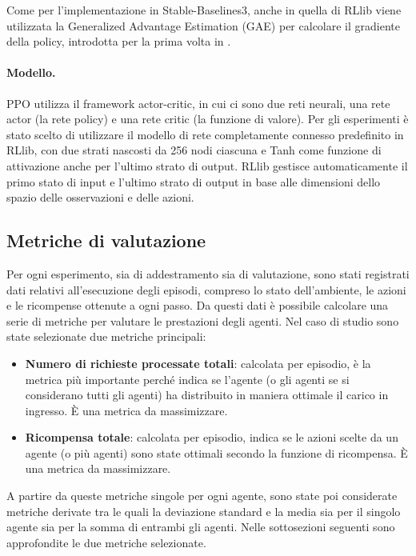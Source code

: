 Come per l'implementazione in Stable-Baselines3, anche in quella di RLlib viene utilizzata la Generalized Advantage Estimation (GAE) per calcolare il gradiente della policy, introdotta per la prima volta in \cite{Schulman2015}.

\paragraph{Modello.} PPO utilizza il framework actor-critic, in cui ci sono due reti neurali, una rete actor (la rete policy) e una rete critic (la funzione di valore). Per gli esperimenti è stato scelto di utilizzare il modello di rete completamente connesso predefinito in RLlib, con due strati nascosti da 256 nodi ciascuna e Tanh come funzione di attivazione anche per l'ultimo strato di output. RLlib gestisce automaticamente il primo stato di input e l'ultimo strato di output in base alle dimensioni dello spazio delle osservazioni e delle azioni.

\subsection{Metriche di valutazione}

Per ogni esperimento, sia di addestramento sia di valutazione, sono stati registrati dati relativi all'esecuzione degli episodi, compreso lo stato dell'ambiente, le azioni e le ricompense ottenute a ogni passo. Da questi dati è possibile calcolare una serie di metriche per valutare le prestazioni degli agenti. Nel caso di studio sono state selezionate due metriche principali:

\begin{itemize}
    \item \textbf{Numero di richieste processate totali}: calcolata per episodio, è la metrica più importante perché indica se l'agente (o gli agenti se si considerano tutti gli agenti) ha distribuito in maniera ottimale il carico in ingresso. È una metrica da massimizzare.

    \item \textbf{Ricompensa totale}: calcolata per episodio, indica se le azioni scelte da un agente (o più agenti) sono state ottimali secondo la funzione di ricompensa. È una metrica da massimizzare.
\end{itemize}

A partire da queste metriche singole per ogni agente, sono state poi considerate metriche derivate tra le quali la deviazione standard e la media sia per il singolo agente sia per la somma di entrambi gli agenti. Nelle sottosezioni seguenti sono approfondite le due metriche selezionate.

